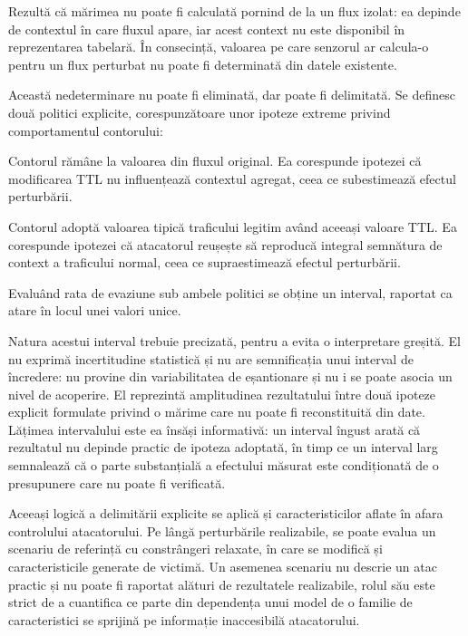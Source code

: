 Rezultă că mărimea nu poate fi calculată pornind de la un flux izolat: ea depinde de contextul în care fluxul apare, iar acest context nu este disponibil în reprezentarea tabelară. În consecință, valoarea pe care senzorul ar calcula-o pentru un flux perturbat nu poate fi determinată din datele existente.

Această nedeterminare nu poate fi eliminată, dar poate fi delimitată. Se definesc două politici explicite, corespunzătoare unor ipoteze extreme privind comportamentul contorului:

\begin{description}[style=nextline]
    \item[Politica conservatoare.] Contorul rămâne la valoarea din fluxul original. Ea corespunde ipotezei că modificarea TTL nu influențează contextul agregat, ceea ce subestimează efectul perturbării.
    \item[Politica optimistă.] Contorul adoptă valoarea tipică traficului legitim având aceeași valoare TTL. Ea corespunde ipotezei că atacatorul reușește să reproducă integral semnătura de context a traficului normal, ceea ce supraestimează efectul perturbării.
\end{description}

Evaluând rata de evaziune sub ambele politici se obține un interval, raportat ca atare în locul unei valori unice.

Natura acestui interval trebuie precizată, pentru a evita o interpretare greșită. El nu exprimă incertitudine statistică și nu are semnificația unui interval de încredere: nu provine din variabilitatea de eșantionare și nu i se poate asocia un nivel de acoperire. El reprezintă amplitudinea rezultatului între două ipoteze explicit formulate privind o mărime care nu poate fi reconstituită din date. Lățimea intervalului este ea însăși informativă: un interval îngust arată că rezultatul nu depinde practic de ipoteza adoptată, în timp ce un interval larg semnalează că o parte substanțială a efectului măsurat este condiționată de o presupunere care nu poate fi verificată.

Aceeași logică a delimitării explicite se aplică și caracteristicilor aflate în afara controlului atacatorului. Pe lângă perturbările realizabile, se poate evalua un scenariu de referință cu constrângeri relaxate, în care se modifică și caracteristicile generate de victimă. Un asemenea scenariu nu descrie un atac practic și nu poate fi raportat alături de rezultatele realizabile, rolul său este strict de a cuantifica ce parte din dependența unui model de o familie de caracteristici se sprijină pe informație inaccesibilă atacatorului.


